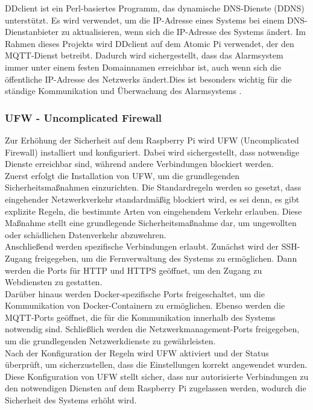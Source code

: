 DDclient ist ein Perl-basiertes Programm, das dynamische DNS-Dienste (DDNS) unterstützt. Es wird verwendet, um die IP-Adresse eines Systems bei einem DNS-Dienstanbieter zu aktualisieren, wenn sich die IP-Adresse des Systems ändert. Im Rahmen dieses Projekts wird DDclient auf dem Atomic Pi verwendet, der den MQTT-Dienst betreibt. Dadurch wird sichergestellt, dass das Alarmsystem immer unter einem festen Domainnamen erreichbar ist, auch wenn sich die öffentliche IP-Adresse des Netzwerks ändert.Dies ist besonders wichtig für die ständige Kommunikation und Überwachung des Alarmsystems \cite{Ddclient}.


\subsubsection{UFW - Uncomplicated Firewall}

Zur Erhöhung der Sicherheit auf dem Raspberry Pi wird UFW (Uncomplicated Firewall) installiert und konfiguriert. Dabei wird sichergestellt, dass notwendige Dienste erreichbar sind, während andere Verbindungen blockiert werden.\\

Zuerst erfolgt die Installation von UFW, um die grundlegenden Sicherheitsmaßnahmen einzurichten. Die Standardregeln werden so gesetzt, dass eingehender Netzwerkverkehr standardmäßig blockiert wird, es sei denn, es gibt explizite Regeln, die bestimmte Arten von eingehendem Verkehr erlauben. Diese Maßnahme stellt eine grundlegende Sicherheitsmaßnahme dar, um ungewollten oder schädlichen Datenverkehr abzuwehren.\\

Anschließend werden spezifische Verbindungen erlaubt. Zunächst wird der SSH-Zugang freigegeben, um die Fernverwaltung des Systems zu ermöglichen. Dann werden die Ports für HTTP und HTTPS geöffnet, um den Zugang zu Webdiensten zu gestatten.\\

Darüber hinaus werden Docker-spezifische Ports freigeschaltet, um die Kommunikation von Docker-Containern zu ermöglichen. Ebenso werden die MQTT-Ports geöffnet, die für die Kommunikation innerhalb des Systems notwendig sind. Schließlich werden die Netzwerkmanagement-Ports freigegeben, um die grundlegenden Netzwerkdienste zu gewährleisten.\\

Nach der Konfiguration der Regeln wird UFW aktiviert und der Status überprüft, um sicherzustellen, dass die Einstellungen korrekt angewendet wurden. Diese Konfiguration von UFW stellt sicher, dass nur autorisierte Verbindungen zu den notwendigen Diensten auf dem Raspberry Pi zugelassen werden, wodurch die Sicherheit des Systems erhöht wird.


